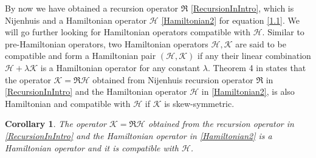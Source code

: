 \documentclass[fleqn,11pt,twoside]{article}
\newtheorem{corollary}{Corollary}[section]
\theoremstyle{definition}
\begin{document}
By now we have obtained a recursion operator
$\mathfrak{R}$ \eqref{RecursionInIntro}, which is Nijenhuis and a Hamiltonian operator
$\mathcal{H}$ \eqref{Hamiltonian2} for equation \eqref{1.1}. We will go further looking for Hamiltonian operators compatible with $\mathcal{H}$. Similar to pre-Hamiltonian operators, two
Hamiltonian operators $\mathcal{H},\mathcal{K}$ are said to be compatible and
form a Hamiltonian pair $\left(\mathcal{H},\mathcal{K}\right)$ if any their linear
combination $\mathcal{H}+\lambda \mathcal{K}$ is a Hamiltonian operator
for any constant $\lambda$.
Theorem 4 in \cite{42} states that the operator
$\mathcal{K} = \mathfrak{R} \mathcal{H}$ obtained from Nijenhuis recursion operator
$\mathfrak{R}$ in \eqref{RecursionInIntro} and the Hamiltonian operator $\mathcal{H}$ in
\eqref{Hamiltonian2}, is also Hamiltonian and compatible
with $\mathcal{H}$ if $\mathcal{K}$ is skew-symmetric.
	\begin{corollary}
		The operator $\mathcal{K} = \mathfrak{R} \mathcal{H}$ obtained
from the recursion operator in \eqref{RecursionInIntro} and the Hamiltonian operator in
\eqref{Hamiltonian2} is a Hamiltonian operator and it is compatible with
$\mathcal{H}$.
	\end{corollary}
\end{document}
